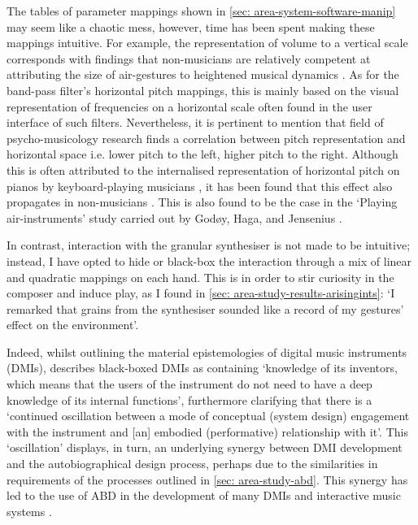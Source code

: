 The tables of parameter mappings shown in \autoref{sec: area-system-software-manip} may seem like a chaotic mess, however, time has been spent making these mappings intuitive. For example, the representation of volume to a vertical scale corresponds with findings that non-musicians are relatively competent at attributing the size of air-gestures to heightened musical dynamics \citep{godoy2006,caramiaux2010}. As for the band-pass filter's horizontal pitch mappings, this is mainly based on the visual representation of frequencies on a horizontal scale often found in the user interface of such filters. Nevertheless, it is pertinent to mention that field of psycho-musicology research \citep{timmers2016} finds a correlation between pitch representation and horizontal space i.e. lower pitch to the left, higher pitch to the right. Although this is often attributed to the internalised representation of horizontal pitch on pianos by keyboard-playing musicians \citep{lidji2007,rusconi2006}, it has been found that this effect also propagates in non-musicians \citep{weis2016}. This is also found to be the case in the `Playing air-instruments' study carried out by Godøy, Haga, and Jensenius \citeyearpar{godoy2006}.

In contrast, interaction with the granular synthesiser is not made to be intuitive; instead, I have opted to hide or black-box the interaction through a mix of linear and quadratic mappings on each hand. This is in order to stir curiosity in the composer and induce play, as I found in \autoref{sec: area-study-results-arisingints}: `I remarked that grains from the synthesiser sounded like a record of my gestures' effect on the environment'.

Indeed, whilst outlining the material epistemologies of digital music instruments (DMIs), \citep{magnusson2009} describes black-boxed DMIs as containing `knowledge of its inventors, which means that the users of the instrument do not need to have a deep knowledge of its internal functions', furthermore clarifying that there is a `continued oscillation between a mode of conceptual (system design) engagement with the instrument and [an] embodied (performative) relationship with it'. This `oscillation' displays, in turn, an underlying synergy between DMI development and the autobiographical design process, perhaps due to the similarities in requirements of the processes outlined in \autoref{sec: area-study-abd}. This synergy has led to the use of ABD in the development of many DMIs and interactive music systems \citep{kiefer2020,martin2017,turchet2018,unander-scharin2014}.

